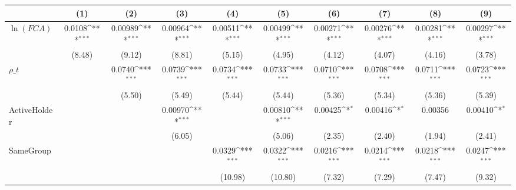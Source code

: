 {
\def\sym#1{\ifmmode^{#1}\else\(^{#1}\)\fi}
\begin{tabular}{l*{9}{c}}
\hline\hline
                    &\multicolumn{1}{c}{(1)}         &\multicolumn{1}{c}{(2)}         &\multicolumn{1}{c}{(3)}         &\multicolumn{1}{c}{(4)}         &\multicolumn{1}{c}{(5)}         &\multicolumn{1}{c}{(6)}         &\multicolumn{1}{c}{(7)}         &\multicolumn{1}{c}{(8)}         &\multicolumn{1}{c}{(9)}         \\
\hline
$\ln(FCA)$          &      0.0108\sym{***}&     0.00989\sym{***}&     0.00964\sym{***}&     0.00511\sym{***}&     0.00499\sym{***}&     0.00271\sym{***}&     0.00276\sym{***}&     0.00281\sym{***}&     0.00297\sym{***}\\
                    &      (8.48)         &      (9.12)         &      (8.81)         &      (5.15)         &      (4.95)         &      (4.12)         &      (4.07)         &      (4.16)         &      (3.78)         \\
[1em]
$ \rho\_t $          &                     &      0.0740\sym{***}&      0.0739\sym{***}&      0.0734\sym{***}&      0.0733\sym{***}&      0.0710\sym{***}&      0.0708\sym{***}&      0.0711\sym{***}&      0.0723\sym{***}\\
                    &                     &      (5.50)         &      (5.49)         &      (5.44)         &      (5.44)         &      (5.36)         &      (5.34)         &      (5.36)         &      (5.39)         \\
[1em]
ActiveHolder        &                     &                     &     0.00970\sym{***}&                     &     0.00810\sym{***}&     0.00425\sym{*}  &     0.00416\sym{*}  &     0.00356         &     0.00410\sym{*}  \\
                    &                     &                     &      (6.05)         &                     &      (5.06)         &      (2.35)         &      (2.40)         &      (1.94)         &      (2.41)         \\
[1em]
SameGroup           &                     &                     &                     &      0.0329\sym{***}&      0.0322\sym{***}&      0.0216\sym{***}&      0.0214\sym{***}&      0.0218\sym{***}&      0.0247\sym{***}\\
                    &                     &                     &                     &     (10.98)         &     (10.80)         &      (7.32)         &      (7.29)         &      (7.47)         &      (9.32)         \\
[1em]

\end{tabular}}
